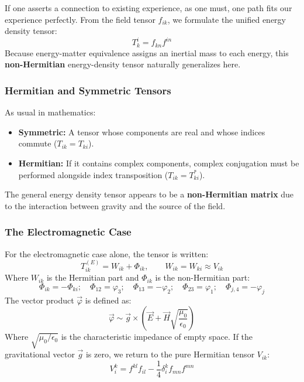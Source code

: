 \documentclass[11pt,a4paper,oneside]{article}
\begin{document}
If one asserts a connection to existing experience, as one must, one path fits our experience perfectly. From the field tensor $f_{ik}$, we formulate the unified energy density tensor:
\begin{equation}
    T^i_k = f_{kn}f^{in} \tag{15}
\end{equation}
Because energy-matter equivalence assigns an inertial mass to each energy, this \textbf{non-Hermitian} energy-density tensor naturally generalizes here.

\subsubsection{Hermitian and Symmetric Tensors}
As usual in mathematics:
\begin{itemize}
    \item \textbf{Symmetric:} A tensor whose components are real and whose indices commute ($T_{ik} = T_{ki}$).
    \item \textbf{Hermitian:} If it contains complex components, complex conjugation must be performed alongside index transposition ($T_{ik} = T^*_{ki}$).
\end{itemize}
The general energy density tensor appears to be a \textbf{non-Hermitian matrix} due to the interaction between gravity and the source of the field.

\subsubsection{The Electromagnetic Case}
For the electromagnetic case alone, the tensor is written:
\begin{equation}
    T^{(E)}_{ik} = W_{ik} + \Phi_{ik}, \qquad W_{ik} = W_{ki} \approx V_{ik} \tag{1}
\end{equation}
Where $W_{ik}$ is the Hermitian part and $\Phi_{ik}$ is the non-Hermitian part:
\begin{equation}
    \Phi_{ik} = -\Phi_{ki}; \quad \Phi_{12} = \varphi_3; \quad \Phi_{13} = -\varphi_2; \quad \Phi_{23} = \varphi_1; \quad \Phi_{j,4} = -\varphi_j \tag{2}
\end{equation}
The vector product $\vec{\varphi}$ is defined as:
\begin{equation}
    \vec{\varphi} \sim \vec{g} \times \left( \vec{E} + \vec{H} \sqrt{\frac{\mu_0}{\epsilon_0}} \right)
\end{equation}
Where $\sqrt{\mu_0/\epsilon_0}$ is the characteristic impedance of empty space. If the gravitational vector $\vec{g}$ is zero, we return to the pure Hermitian tensor $V_{ik}$:
\begin{equation}
    V^k_i = f^{kl}f_{il} - \frac{1}{4} \delta^k_i f_{mn}f^{mn} \tag{4}
\end{equation}
\end{document}
